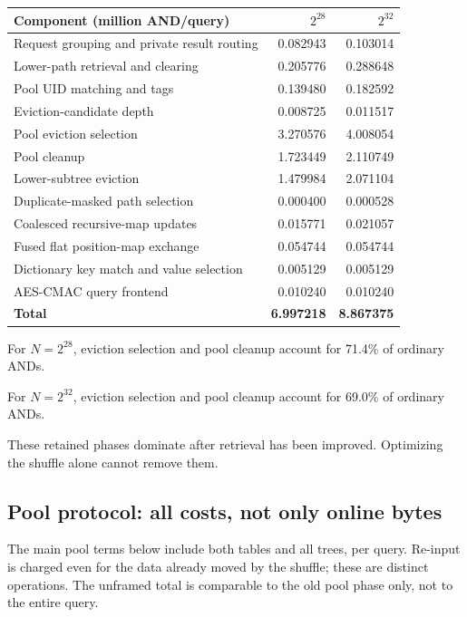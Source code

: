 \documentclass[11pt]{article}
\begin{document}
\begin{center}\small
\begin{tabular}{lrr}\toprule
Component (million AND/query) & $2^{28}$ & $2^{32}$\\\midrule
Request grouping and private result routing & 0.082943 & 0.103014\\
Lower-path retrieval and clearing & 0.205776 & 0.288648\\
Pool UID matching and tags & 0.139480 & 0.182592\\
Eviction-candidate depth & 0.008725 & 0.011517\\
Pool eviction selection & 3.270576 & 4.008054\\
Pool cleanup & 1.723449 & 2.110749\\
Lower-subtree eviction & 1.479984 & 2.071104\\
Duplicate-masked path selection & 0.000400 & 0.000528\\
Coalesced recursive-map updates & 0.015771 & 0.021057\\
Fused flat position-map exchange & 0.054744 & 0.054744\\
Dictionary key match and value selection & 0.005129 & 0.005129\\
AES-CMAC query frontend & 0.010240 & 0.010240\\
\textbf{Total} & \textbf{6.997218} & \textbf{8.867375}\\
\bottomrule\end{tabular}
\end{center}

For $N=2^{28}$, eviction selection and pool cleanup account for 71.4\% of ordinary ANDs.

For $N=2^{32}$, eviction selection and pool cleanup account for 69.0\% of ordinary ANDs.

These retained phases dominate after retrieval has been
improved. Optimizing the shuffle alone cannot remove them.

\subsection{Pool protocol: all costs, not only online bytes}
The main pool terms below include both tables and all trees, per query.
Re-input is charged even for the data already moved by the shuffle; these
are distinct operations. The unframed total is comparable to the old pool
phase only, not to the entire query.
\end{document}
